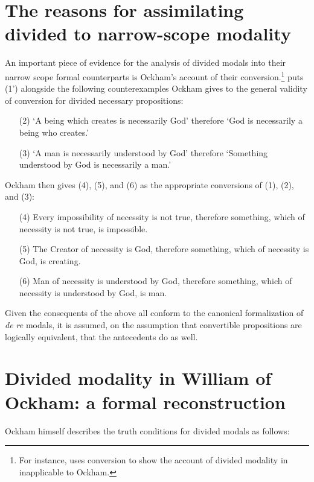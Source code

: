 \documentclass[a4paper]{article}
\begin{document}
\section{The reasons for assimilating divided to narrow-scope modality}
An important piece of evidence for the analysis of divided modals into their narrow scope formal counterparts is Ockham's account of their conversion.\footnote{For instance, \cite[p. 276]{PriestRead1981} uses conversion to show the account of divided modality in \cite[sec. 12]{Moody1952} inapplicable to Ockham.} \cite[p. 242]{Johnston2015} puts (1') alongside the following counterexamples Ockham gives to the general validity of conversion for divided necessary propositions:
\begin{enumerate}
	\item[(2)]	`A being which creates is necessarily God' therefore `God is necessarily a being who creates.' 
	\item[(3)]	`A man is necessarily understood by God' therefore `Something understood by God is necessarily a man.' \cite[II. 24, p. 298]{OckhamSL2}
\end{enumerate}

Ockham then gives (4), (5), and (6) as the appropriate conversions of (1), (2), and (3):

\begin{enumerate}
\item[(4)]	Every impossibility of necessity is not true, therefore something, which of necessity is not true, is impossible.
\item[(5)]	The Creator of necessity is God, therefore something, which of necessity is God, is creating.
\item[(6)]	Man of necessity is understood by God, therefore something, which of necessity is understood by God, is man. \cite[II. 24, p. 298]{OckhamSL2}
\end{enumerate}

Given the consequents of the above all conform to the canonical formalization of \textit{de re} modals, it is assumed, on the assumption that convertible propositions are logically equivalent, that the antecedents do as well.

\section{Divided modality in William of Ockham: a formal reconstruction}
Ockham himself describes the truth conditions for divided modals as follows:
\end{document}
